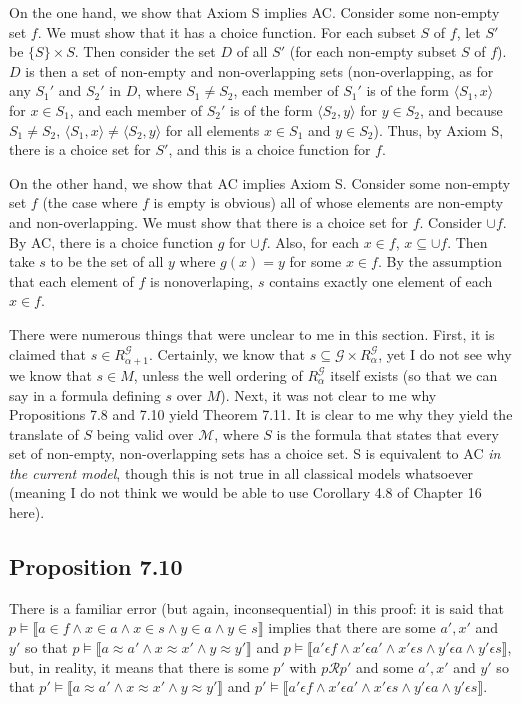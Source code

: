 \documentclass{article}
\newcommand{\lbc}{\llbracket}
\newcommand{\rbc}{\rrbracket}
\theoremstyle{definition}
\begin{document}
On the one hand, we show that Axiom S implies AC. Consider some non-empty set $f$. We must show that it has a choice function.
For each subset $S$ of $f$, let $S'$ be $\{S\}\times S$. Then consider the set $D$ of all $S'$ (for each non-empty subset $S$ of $f$). 
$D$ is then a set of non-empty and non-overlapping sets (non-overlapping, as for any $S_1'$ and $S_2'$ in $D$, where 
$S_1\ne S_2$, each member of $S_1'$ is of the form $\langle S_1,x\rangle$ for $x\in S_1$, and each member of $S_2'$ is 
of the form $\langle S_2,y\rangle$ for $y\in S_2$, and because $S_1\ne S_2$, $\langle S_1,x\rangle\ne\langle S_2,y\rangle$ for all 
elements $x\in S_1$ and $y\in S_2$). Thus, by Axiom S, there is a choice set for $S'$, and this is a choice function 
for $f$.

On the other hand, we show that AC implies Axiom S. Consider some non-empty set $f$ (the case where $f$ is empty is obvious) all of whose 
elements are non-empty and non-overlapping. We must show that there is a choice set for $f$. Consider $\cup f$. By AC, there is a 
choice function $g$ for $\cup f$. Also, for each $x\in f$, $x\subseteq\cup f$. Then take $s$ to be the set of all 
$y$ where $g(x)=y$ for some $x\in f$. By the assumption that each element of $f$ is nonoverlaping, 
$s$ contains exactly one element of each $x\in f$. 

There were numerous things that were unclear to me in this section. First, it is claimed that $s\in R^\mathcal{G}_{\alpha+1}$. Certainly, 
we know that $s\subseteq\mathcal{G}\times R^\mathcal{G}_\alpha$, yet I do not see why we know that $s\in M$, unless 
the well ordering of $R^\mathcal{G}_\alpha$ itself exists (so that we can say  in a formula defining 
$s$ over $M$). Next, it was not clear to me why Propositions 7.8 and 7.10 yield Theorem 7.11. It is clear to me why they yield 
the translate of $S$ being valid over $\mathcal{M}$, where $S$ is the formula that states that every set of 
non-empty, non-overlapping sets has a choice set. S is equivalent to AC \textit{in the current model}, though 
this is not true in all classical models whatsoever (meaning I do not think we would be able to use Corollary 4.8 of Chapter 16 here).

\subsection*{Proposition 7.10}
There is a familiar error (but again, inconsequential) in this proof: it is said that 
$p\vDash\lbc a\in f\wedge x\in a\wedge x\in s\wedge y\in a\wedge y\in s\rbc$ implies 
that there are some $a',x'$ and $y'$ so that $p\vDash\lbc a\approx a'\wedge x\approx x'\wedge y\approx y'\rbc$ and 
$p\vDash\lbc a'\epsilon f\wedge x'\epsilon a'\wedge x'\epsilon s\wedge y'\epsilon a\wedge y'\epsilon s\rbc$, but, in reality, 
it means that there is some $p'$ with $p\mathcal{R}p'$ and some $a',x'$ and $y'$ so that
$p'\vDash\lbc a\approx a'\wedge x\approx x'\wedge y\approx y'\rbc$ and
$p'\vDash\lbc a'\epsilon f\wedge x'\epsilon a'\wedge x'\epsilon s\wedge y'\epsilon a\wedge y'\epsilon s\rbc$.
\end{document}
